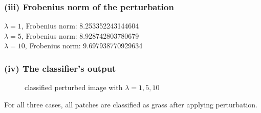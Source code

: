 \documentclass[11pt]{article}
\begin{document}
\subsubsection*{(iii) Frobenius norm of the perturbation}
$\lambda=1$, Frobenius norm: 8.253352243144604\\
$\lambda=5$, Frobenius norm: 8.928742803780679\\
$\lambda=10$, 	Frobenius norm: 9.697938770929634\\
\pagebreak
\subsubsection*{(iv) The classifier’s output}
\begin{figure}[h]
	\centering
	\caption{classified perturbed image with $\lambda = 1, 5, 10$}
\end{figure}
For all three cases, all patches are classified as grass after applying perturbation.
\pagebreak
\end{document}
